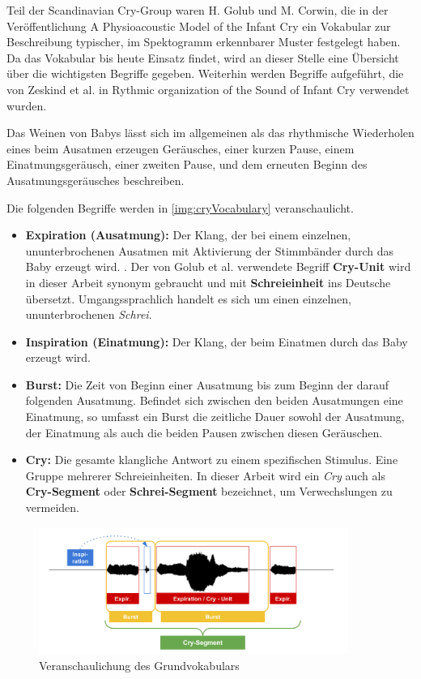 Teil der Scandinavian Cry-Group waren H. Golub und M. Corwin, die in der Veröffentlichung \glqq A Physioacoustic Model of the Infant Cry\grqq \cite{cryModel} ein Vokabular zur Beschreibung typischer, im Spektogramm erkennbarer Muster festgelegt haben. Da das Vokabular bis heute Einsatz findet, wird an dieser Stelle eine Übersicht über die wichtigsten Begriffe gegeben. Weiterhin werden Begriffe aufgeführt, die von Zeskind et al. in \glqq Rythmic organization of the Sound of Infant Cry\grqq{} verwendet wurden.\cite{rythmic}

Das Weinen von Babys lässt sich im allgemeinen als das \glqq rhythmische Wiederholen eines beim Ausatmen erzeugen Geräusches, einer kurzen Pause, einem Einatmungsgeräusch, einer zweiten Pause, und dem erneuten Beginn des Ausatmungsgeräusches\grqq{} beschreiben.\cite{wolff}

Die folgenden Begriffe werden in \autoref{img:cryVocabulary} veranschaulicht.

\begin{itemize}
	\item \textbf{Expiration (Ausatmung):} Der Klang, der bei einem einzelnen, ununterbrochenen Ausatmen mit Aktivierung der Stimmbänder durch das Baby erzeugt wird. \cite{rythmic}. Der von Golub et al. \cite[S. 61]{cryModel} verwendete Begriff \textbf{Cry-Unit} wird in dieser Arbeit synonym gebraucht und mit \textbf{Schreieinheit} ins Deutsche übersetzt. Umgangssprachlich handelt es sich um einen einzelnen, ununterbrochenen \emph{Schrei}.
	\item \textbf{Inspiration (Einatmung):} Der Klang, der beim Einatmen durch das Baby erzeugt wird.
	\item  \textbf{Burst:} Die Zeit von Beginn einer Ausatmung bis zum Beginn der darauf folgenden Ausatmung. Befindet sich zwischen den beiden Ausatmungen eine Einatmung, so umfasst ein Burst die zeitliche Dauer sowohl der Ausatmung, der Einatmung als auch die beiden Pausen zwischen diesen Geräuschen.\cite{rythmic}
	\item  \textbf{Cry:} Die gesamte klangliche Antwort zu einem spezifischen Stimulus. Eine Gruppe mehrerer Schreieinheiten.\cite[S. 61]{cryModel} In dieser Arbeit wird ein \emph{Cry} auch als \textbf{Cry-Segment} oder \textbf{Schrei-Segment} bezeichnet, um Verwechslungen zu vermeiden.
\end{itemize}

\begin{figure}[H]
	\centering
	\includegraphics[width=0.9\textwidth]{bilder/cryVoc02.png}
	\caption{Veranschaulichung des Grundvokabulars}
	\label{img:cryVocabulary}
\end{figure}

